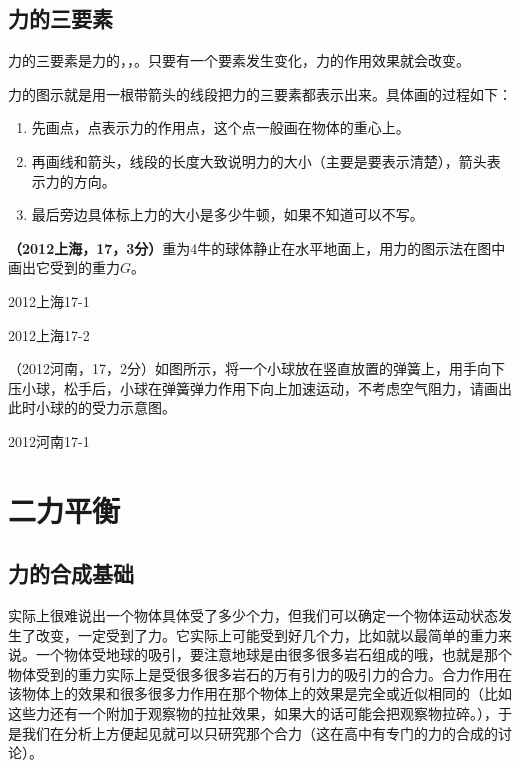 \documentclass[12pt,twoside]{exam}
\begin{document}
\begin{knowledge}
\subsection{力的三要素}
力的三要素是力的\answerline*[大小]，\answerline*[方向]，\answerline*[作用点]。只要有一个要素发生变化，力的作用效果就会改变。

力的图示就是用一根带箭头的线段把力的三要素都表示出来。具体画的过程如下：
\begin{enumerate}
\item 先画点，点表示力的作用点，这个点一般画在物体的重心上。
\item 再画线和箭头，线段的长度大致说明力的大小（主要是要表示清楚），箭头表示力的方向。
\item 最后旁边具体标上力的大小是多少牛顿，如果不知道可以不写。
\end{enumerate}


\textbf{（2012上海，17，3分）}重为4牛的球体静止在水平地面上，用力的图示法在图中画出它受到的重力$G$。
\begin{multicols}{2}
\begin{linefig}[0.8]{2012上海17-1}
\end{linefig}
\columnbreak
\begin{solution}
\begin{linefig}[0.9]{2012上海17-2}
\end{linefig}
\end{solution}
\end{multicols}

（2012河南，17，2分）如图所示，将一个小球放在竖直放置的弹簧上，用手向下压小球，松手后，小球在弹簧弹力作用下向上加速运动，不考虑空气阻力，请画出此时小球的的受力示意图。

\begin{linefig}[0.4]{2012河南17-1}
\end{linefig}


\section{二力平衡}
\subsection{力的合成基础}
实际上很难说出一个物体具体受了多少个力，但我们可以确定一个物体运动状态发生了改变，一定受到了力。它实际上可能受到好几个力，比如就以最简单的重力来说。一个物体受地球的吸引，要注意地球是由很多很多岩石组成的哦，也就是那个物体受到的重力实际上是受很多很多岩石的万有引力的吸引力的合力。合力作用在该物体上的效果和很多很多力作用在那个物体上的效果是完全或近似相同的（比如这些力还有一个附加于观察物的拉扯效果，如果大的话可能会把观察物拉碎。），于是我们在分析上方便起见就可以只研究那个合力（这在高中有专门的力的合成的讨论）。


\end{knowledge}
\end{document}
